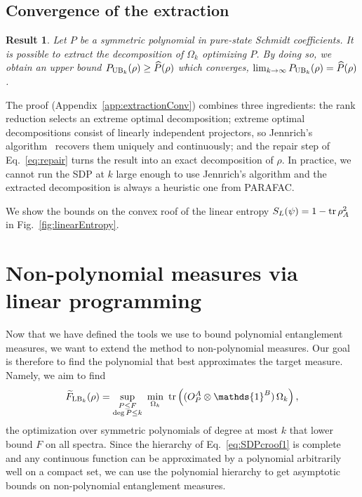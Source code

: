 \documentclass[11pt,a4paper]{report}
\newcommand{\one}{\mathds{1}}
\newcommand{\I}{\one}
\newtheorem{result}[theorem]{Result}
\newcounter{reptag}
\newif\iftags \tagsfalse   %
\newcommand{\reptagbox}[3]{\iftags\par\smallskip\noindent\refstepcounter{reptag}%
  \fcolorbox{#1}{#1!7}{\parbox{\dimexpr\linewidth-2\fboxsep-2\fboxrule\relax}{\small
  \textcolor{#1}{\textbf{[\thereptag]\ #2.}}\ #3}}\par\smallskip\fi}
\newcommand{\detail}[1]{\reptagbox{tagD}{More detail}{#1}}
\begin{document}
\section{Convergence of the extraction}
\begin{result}\label{thm:extraction}
    Let $P$ be a symmetric polynomial in pure-state Schmidt coefficients.
    It is possible to extract the decomposition of $\Omega_k$ optimizing $P$. By doing so, we obtain an upper bound $P_{{\rm UB}_k}(\rho)\geq \widehat{P}(\rho)$ which converges, $\lim_{k\rightarrow\infty}P_{{\rm UB}_k}(\rho)=\widehat{P}(\rho)$.
\end{result}
The proof (Appendix~\ref{app:extractionConv}) combines three ingredients: the rank reduction selects an extreme optimal decomposition; extreme optimal decompositions consist of linearly independent projectors, so Jennrich's algorithm~\cite{Harshman1970,Leurgans1993} recovers them uniquely and continuously; and the repair step of Eq.~\eqref{eq:repair} turns the result into an exact decomposition of $\rho$. In practice, we cannot run the SDP at $k$ large enough to use Jennrich's algorithm and the extracted decomposition is always a heuristic one from PARAFAC.
\detail{Report how well the heuristic works: the fit error $\Theta_k$; the number of terms found against $r$ and $r^2$; how much the repair step changes the value; and the effect of rank reduction (for two qubits the residual dropped from about 20\,\% to $10^{-7}$--$10^{-11}$). The rank observation from \texttt{material.md} is worth a paragraph: for the tight states the rank of $\Omega_3$ equals the number of terms (tiles 5, pyramid 5, chessboard 10, Horodecki $2\times4$ 7), but rank flatness alone is not sufficient.}

We show the bounds on the convex roof of the linear entropy $S_L(\psi)=1-\tr\rho_A^2$ in Fig.~\ref{fig:linearEntropy}.



\chapter{Non-polynomial measures via linear programming}\label{sec:LP}

Now that we have defined the tools we use to bound polynomial entanglement measures, we want to extend the method to non-polynomial measures. Our goal is therefore to find the polynomial that best approximates the target measure. Namely, we aim to find
\begin{equation}\label{eq:FLBexact}
    \widetilde{F}_{{\rm LB}_k}(\rho)=\sup_{\substack{P\leq F\\ \deg P\leq k}}\ \min_{\Omega_k}\ \tr\left((O_P^A\otimes\I^B)\,\Omega_k\right),
\end{equation}
the optimization over symmetric polynomials of degree at most $k$ that lower bound $F$ on all spectra. Since the hierarchy of Eq.~\eqref{eq:SDPcroof1} is complete and any continuous function can be approximated by a polynomial arbitrarily well on a compact set, we can use the polynomial hierarchy to get asymptotic bounds on non-polynomial entanglement measures.
\end{document}
